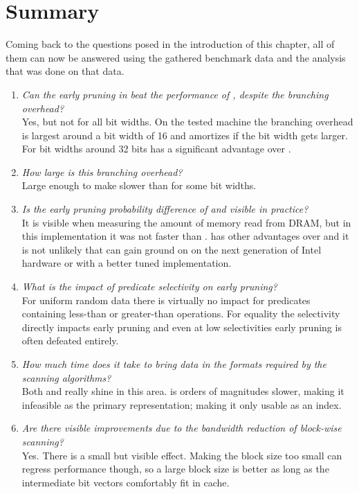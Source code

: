 \newpage
\section{Summary}

Coming back to the questions posed in the introduction of this chapter, all of
them can now be answered using the gathered benchmark data and the analysis that
was done on that data.

\begin{enumerate}
  \item \emph{Can the early pruning in \bwv{} beat the performance of
    \simdscan{}, despite the branching overhead?}\\
    Yes, but not for all bit widths.  On the tested machine the branching
    overhead is largest around a bit width of 16 and amortizes if the bit width
    gets larger. For bit widths around 32 bits \bwv{} has a significant advantage
    over \simdscan{}.
  \item \emph{How large is this branching overhead?}\\
    Large enough to make \bwv{} slower than \simdscan{} for some bit widths.
  \item \emph{Is the early pruning probability difference of \bwv{} and \bs{}
    visible in practice?}\\
    It is visible when measuring the amount of memory read from DRAM, but in this
    implementation it was not faster than \bwv{}. \bs{} has other advantages
    over \bwv{} and it is not unlikely that \bs{} can gain ground on \bwv{} on
    the next generation of Intel hardware or with a better tuned implementation.
  \item \emph{What is the impact of predicate selectivity on early pruning?}\\
    For uniform random data there is virtually no impact for predicates
    containing less-than or greater-than operations. For equality the
    selectivity directly impacts early pruning and even at low selectivities
    early pruning is often defeated entirely.
  \item \emph{How much time does it take to bring data in the formats required
    by the scanning algorithms?}\\
    Both \simdscan{} and \bs{} really shine in this area. \bwv{} is orders of
    magnitudes slower, making it infeasible as the primary representation;
    making it only usable as an index.
  \item \emph{Are there visible improvements due to the bandwidth reduction of
    block-wise scanning?}\\
    Yes. There is a small but visible effect. Making the block size too small
    can regress performance though, so a large block size is better as long as
    the intermediate bit vectors comfortably fit in cache.
\end{enumerate}
